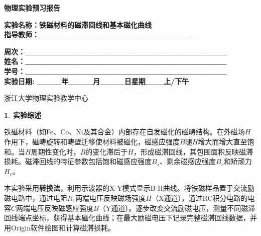 \documentclass[a4paper,12pt]{article}
\begin{document}
\begin{center}
    \vspace*{2cm}
    {\fontsize{36pt}{43pt}\selectfont \textbf{物理实验预习报告}}
    \vspace{3cm}
\end{center}

\begin{center}
    \fontsize{16pt}{24pt}\selectfont
    \textbf{实验名称：铁磁材料的磁滞回线和基本磁化曲线\quad} \\[0.5em]
    \textbf{指导教师：\_\_\_\_\_\_\_\_\_\_\_\_\_\_\_\_\_\_\_\_\_\_\_\_\_}
\end{center}

\vspace{2cm}

\begin{center}
    \fontsize{14pt}{28pt}\selectfont
    \textbf{周次：\_\_\_\_\_\_\_\_\_\_\_\_\_\_\_\_\_\_\_\_\_\_\_\_\_\_\_\_\_\_\_\_\_} \\
    \textbf{姓名：\_\_\_\_\_\_\_\_\_\_\_\_\_\_\_\_\_\_\_\_\_\_\_\_\_\_\_\_\_\_\_\_\_} \\
    \textbf{学号：\_\_\_\_\_\_\_\_\_\_\_\_\_\_\_\_\_\_\_\_\_\_\_\_\_\_\_\_\_\_\_\_\_} \\[0.5em]
    \textbf{实验日期: \_\_\_\_年\_\_\_\_月\_\_\_\_日\quad 星期\_\_\_上/下午}
\end{center}

\vspace{1.5cm}

\begin{center}
    \fontsize{14pt}{20pt}\selectfont
    浙江大学物理实验教学中心
\end{center}

\newpage


{\fontsize{14pt}{20pt}\selectfont \textbf{1. 实验综述}}

\vspace{0.3cm}

{\fontsize{12pt}{18pt}\selectfont

铁磁材料（如Fe、Co、Ni及其合金）内部存在自发磁化的磁畴结构。在外磁场$H$作用下，磁畴旋转和畴壁迁移使材料被磁化，磁感应强度$B$随$H$增大而增大直至饱和。当$H$周期性变化时，$B$的变化滞后于$H$，形成磁滞回线，其包围面积反映磁滞损耗。磁滞回线的特征参数包括饱和磁感应强度$B_s$、剩余磁感应强度$B_r$和矫顽力$H_c$。

本实验采用\textbf{转换法}，利用示波器的X-Y模式显示B-H曲线。将铁磁样品置于交流励磁电路中，通过电阻$R_1$两端电压反映磁场强度$H$（X通道），通过RC积分电路的电容$C$两端电压反映磁感应强度$B$（Y通道）。逐步改变交流励磁电压，测量不同磁滞回线端点坐标，获得基本磁化曲线；在最大励磁电压下记录完整磁滞回线数据，并用Origin软件绘图和计算磁滞损耗。

}
\end{document}
